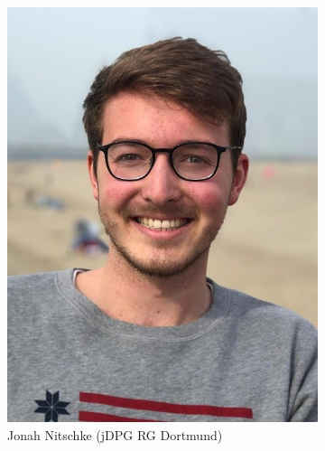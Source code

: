 \documentclass[compress, aspectratio=169]{beamer}
\begin{document}
\begin{frame}
\begin{figure}
\begin{subfigure}[t]{0.24\textwidth}
				\includegraphics[width = \textwidth]{Nitschke.jpeg}
				\caption*{Jonah Nitschke (jDPG RG Dortmund)}
		\end{subfigure}
				\begin{subfigure}[t]{0.24\textwidth}

\end{subfigure}
\end{figure}
\end{frame}
\end{document}
